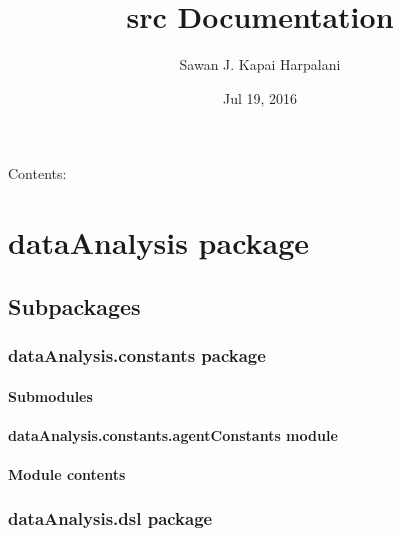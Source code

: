 \documentclass[letterpaper,10pt,english]{sphinxmanual}
\title{src Documentation}
\date{Jul 19, 2016}
\author{Sawan J. Kapai Harpalani}
\begin{document}
\maketitle
\tableofcontents
{}\label{index::doc}


Contents:


\chapter{dataAnalysis package}
\label{dataAnalysis::doc}\label{dataAnalysis:welcome-to-src-s-documentation}\label{dataAnalysis:dataanalysis-package}

\section{Subpackages}
\label{dataAnalysis:subpackages}

\subsection{dataAnalysis.constants package}
\label{dataAnalysis.constants::doc}\label{dataAnalysis.constants:dataanalysis-constants-package}

\subsubsection{Submodules}
\label{dataAnalysis.constants:submodules}

\subsubsection{dataAnalysis.constants.agentConstants module}
\label{dataAnalysis.constants:module-dataAnalysis.constants.agentConstants}\label{dataAnalysis.constants:dataanalysis-constants-agentconstants-module}

\subsubsection{Module contents}
\label{dataAnalysis.constants:module-dataAnalysis.constants}\label{dataAnalysis.constants:module-contents}

\subsection{dataAnalysis.dsl package}
\label{dataAnalysis.dsl:dataanalysis-dsl-package}\label{dataAnalysis.dsl::doc}
\end{document}
